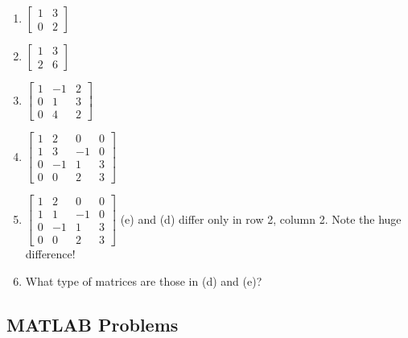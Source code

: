 \documentclass[../main.tex]{subfiles}
\begin{document}
\begin{enumerate}[label=\textbf{2.\arabic*}]
	\begin{enumerate}[label=\textbf{\alph*.}]
	\item  $\left[\begin{array}{ll}1 & 3 \\ 0 & 2\end{array}\right]$
	\item $\left[\begin{array}{ll}1 & 3 \\ 2 & 6\end{array}\right]$
	\item $\left[\begin{array}{ccc}1 & -1 & 2 \\ 0 & 1 & 3 \\ 0 & 4 & 2\end{array}\right]$
	\item $\left[\begin{array}{cccc}1 & 2 & 0 & 0 \\ 1 & 3 & -1 & 0 \\ 0 & -1 & 1 & 3 \\ 0 & 0 & 2 & 3\end{array}\right]$
	\item $\left[\begin{array}{cccc}1 & 2 & 0 & 0 \\ 1 & 1 & -1 & 0 \\ 0 & -1 & 1 & 3 \\ 0 & 0 & 2 & 3\end{array}\right]$
	(e) and (d) differ only in row 2, column 2. Note the huge difference!
	\item What type of matrices are those in (d) and (e)?
\end{enumerate}

\end{enumerate}

\subsection{ MATLAB Problems}
\end{document}
